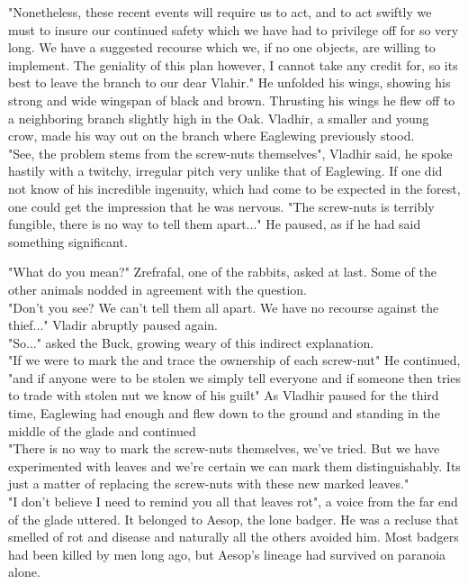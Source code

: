 \documentclass[smalldemyvopaper,11pt,twoside,onecolumn,openright,extrafontsizes]{memoir}
\begin{document}
"Nonetheless, these recent events will require us to act, and to act swiftly we must to insure our continued safety which we have had to privilege off for so very long. We have a suggested recourse which we, if no one objects, are willing to implement. The geniality of this plan however, I cannot take any credit for, so its best to leave the branch to our dear Vlahir." He unfolded his wings, showing his strong and wide wingspan of black and brown. Thrusting his wings he flew off to a neighboring branch slightly high in the Oak. Vladhir, a smaller and young crow, made his way out on the branch where Eaglewing previously stood.\\

"See, the problem stems from the screw-nuts themselves", Vladhir said, he spoke hastily with a twitchy, irregular pitch very unlike that of Eaglewing. If one did not know of his incredible ingenuity, which had come to be expected in the forest, one could get the impression that he was nervous. "The screw-nuts is terribly fungible, there is no way to tell them apart..." He paused, as if he had said something significant.  

"What do you mean?" Zrefrafal, one of the rabbits, asked at last. Some of the other animals nodded in agreement with the question.\\

"Don't you see? We can't tell them all apart. We have no recourse against the thief..." Vladir abruptly paused again.\\

"So..." asked the Buck, growing weary of this indirect explanation.\\

"If we were to mark the and trace the ownership of each screw-nut" He continued, "and if anyone were to be stolen we simply tell everyone and if someone then tries to trade with stolen nut we know of his guilt" As Vladhir paused for the third time, Eaglewing had enough and flew down to the ground and standing in the middle of the glade and continued \\

"There is no way to mark the screw-nuts themselves, we've tried. But we have experimented with leaves and we're certain we can mark them distinguishably. Its just a matter of replacing the screw-nuts with these new marked leaves."\\

"I don't believe I need to remind you all that leaves rot", a voice from the far end of the glade uttered. It belonged to Aesop, the lone badger. He was a recluse that smelled of rot and disease and naturally all the others avoided him. Most badgers had been killed by men long ago, but Aesop's lineage had survived on paranoia alone. 
\end{document}
